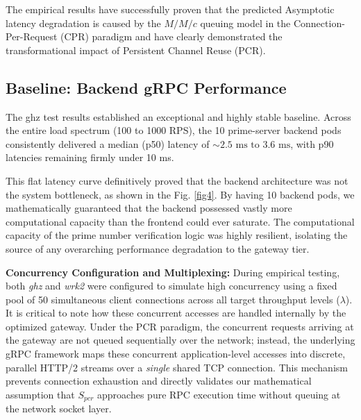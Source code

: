 \documentclass{ieeeaccess}
\begin{document}
The empirical results have successfully proven that the predicted Asymptotic latency degradation is caused by the $M/M/c$ queuing model in the Connection-Per-Request (CPR) paradigm and have clearly demonstrated the transformational impact of Persistent Channel Reuse (PCR). 


\subsection{Baseline: Backend gRPC Performance}
\label{sec5.1}



The ghz test results established an exceptional and highly stable baseline. Across the entire load spectrum (100 to 1000 RPS), the 10 prime-server backend pods consistently delivered a median (p50) latency of $\sim 2.5 \text{ ms} \text{ to } 3.6 \text{ ms}$, with p90 latencies remaining firmly under 10 ms. 

This flat latency curve definitively proved that the backend architecture was not the system bottleneck, as shown in the Fig. \ref{fig4}. By having 10 backend pods, we mathematically guaranteed that the backend possessed vastly more computational capacity than the frontend could ever saturate. The computational capacity of the prime number verification logic was highly resilient, isolating the source of any overarching performance degradation to the gateway tier.

\textbf{Concurrency Configuration and Multiplexing:}
During empirical testing, both \textit{ghz} and \textit{wrk2} were configured to simulate high concurrency using a fixed pool of 50 simultaneous client connections across all target throughput levels ($\lambda$). It is critical to note how these concurrent accesses are handled internally by the optimized gateway. Under the PCR paradigm, the concurrent requests arriving at the gateway are not queued sequentially over the network; instead, the underlying gRPC framework maps these concurrent application-level accesses into discrete, parallel HTTP/2 streams over a \textit{single} shared TCP connection. This mechanism prevents connection exhaustion and directly validates our mathematical assumption that $S_{pcr}$ approaches pure RPC execution time without queuing at the network socket layer.
\end{document}
